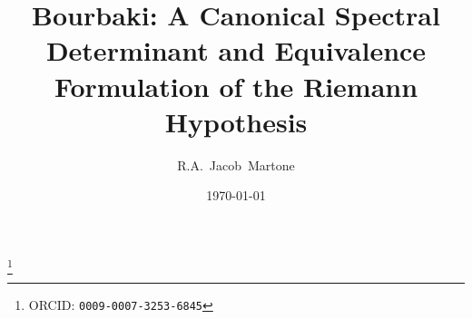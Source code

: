 
\title[Bourbaki: Spectral Reformulation of the Riemann Hypothesis]%
  {Bourbaki: A Canonical Spectral Determinant and Equivalence Formulation of the Riemann Hypothesis}

\author[R.A.~Jacob~Martone]{R.A.~Jacob~Martone}
\address{Radio Park Area, Fresno, California, USA}
\thanks{ORCID: \texttt{0009-0007-3253-6845}}


\date{\today}
